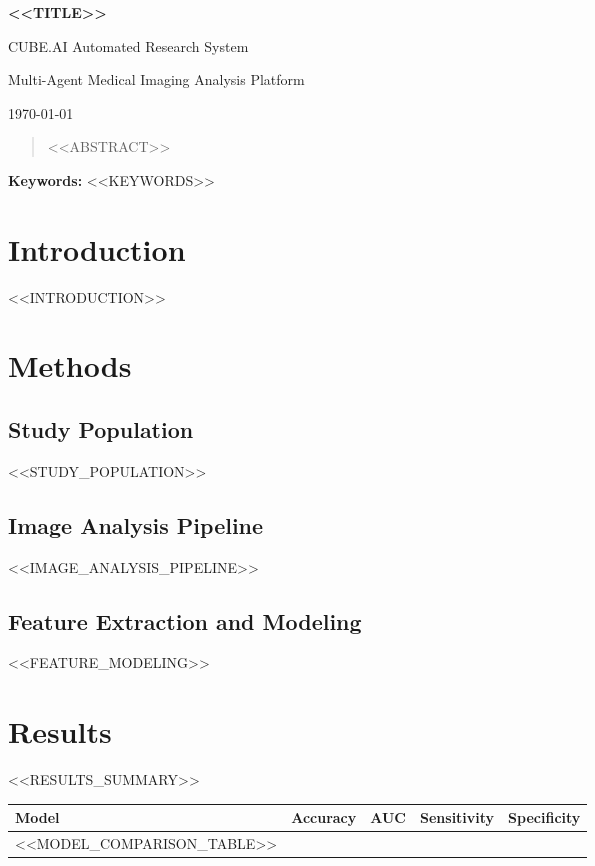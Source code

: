 \documentclass[11pt,a4paper]{article}
\begin{document}
\begin{center}
{\LARGE\bfseries <<TITLE>>}

\vspace{0.5em}
{\large CUBE.AI Automated Research System}

\vspace{0.3em}
{\normalsize Multi-Agent Medical Imaging Analysis Platform}

\vspace{0.5em}
\today
\end{center}

\vspace{1em}

\begin{abstract}
<<ABSTRACT>>
\end{abstract}

\noindent\textbf{Keywords:} <<KEYWORDS>>

\section{Introduction}
<<INTRODUCTION>>

\section{Methods}

\subsection{Study Population}
<<STUDY_POPULATION>>

\subsection{Image Analysis Pipeline}
<<IMAGE_ANALYSIS_PIPELINE>>

\subsection{Feature Extraction and Modeling}
<<FEATURE_MODELING>>

\section{Results}

<<RESULTS_SUMMARY>>

\vspace{0.5em}
\begin{center}
\begin{tabular}{lcccc}
\toprule
\textbf{Model} & \textbf{Accuracy} & \textbf{AUC} & \textbf{Sensitivity} & \textbf{Specificity} \\
\midrule
<<MODEL_COMPARISON_TABLE>>
\bottomrule
\end{tabular}
\end{center}
\end{document}
